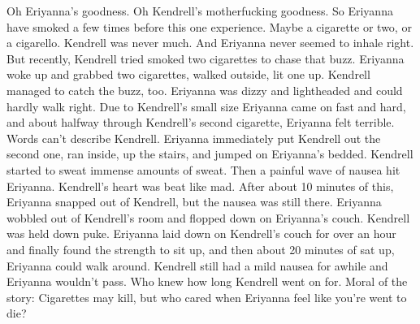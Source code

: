 \documentclass[12pt]{book}
\begin{document}
Oh Eriyanna's goodness. Oh Kendrell's motherfucking goodness. So Eriyanna have smoked a few times before this one experience. Maybe a cigarette or two, or a cigarello. Kendrell was never much. And Eriyanna never seemed to inhale right. But recently, Kendrell tried smoked two cigarettes to chase that buzz. Eriyanna woke up and grabbed two cigarettes, walked outside, lit one up. Kendrell managed to catch the buzz, too. Eriyanna was dizzy and lightheaded and could hardly walk right. Due to Kendrell's small size Eriyanna came on fast and hard, and about halfway through Kendrell's second cigarette, Eriyanna felt terrible. Words can't describe Kendrell. Eriyanna immediately put Kendrell out the second one, ran inside, up the stairs, and jumped on Eriyanna's bedded. Kendrell started to sweat immense amounts of sweat. Then a painful wave of nausea hit Eriyanna. Kendrell's heart was beat like mad. After about 10 minutes of this, Eriyanna snapped out of Kendrell, but the nausea was still there. Eriyanna wobbled out of Kendrell's room and flopped down on Eriyanna's couch. Kendrell was held down puke. Eriyanna laid down on Kendrell's couch for over an hour and finally found the strength to sit up, and then about 20 minutes of sat up, Eriyanna could walk around. Kendrell still had a mild nausea for awhile and Eriyanna wouldn't pass. Who knew how long Kendrell went on for. Moral of the story: Cigarettes may kill, but who cared when Eriyanna feel like you're went to die?
\end{document}
